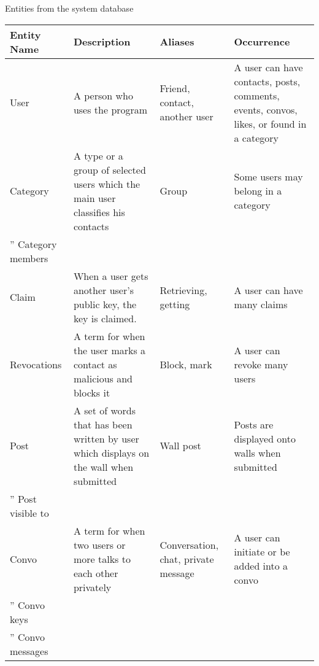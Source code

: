 Entities from the system database
\begin{center}
    \begin{tabular}{| l | l | l | l |}
    \hline
    Entity Name      & Description                                                                                              & Aliases                             & Occurrence                                     \\ \hline
    User             & A person who uses the program                                                                            & Friend, contact, another user       & A user can have contacts, posts, comments, events, convos, likes, or found in a category                                              \\ \hline
    Category         & A type or a group of selected users which the main user classifies his contacts                          & Group                               & Some users may belong in a category           \\ \hline
   '' Category members        &                      &                               &            \\ \hline
    Claim            & When a user gets another user's public key, the key is claimed.                                          & Retrieving, getting                 & A user can have many claims                   \\ \hline
    Revocations      & A term for when the user marks a contact as malicious and blocks it                                      & Block, mark                         & A user can revoke many users                  \\ \hline
    Post             & A set of words that has been written by user which displays on the wall when submitted                   & Wall post                           & Posts are displayed onto walls when submitted \\ \hline
   '' Post visible to         &                          &                           &         \\ \hline
    Convo            & A term for when two users or more talks to each other privately                                          & Conversation, chat, private message & A user can initiate or be added into a convo  \\ \hline
   '' Convo keys        &                          &                                &         \\ \hline
   '' Convo messages        &                          &                                &         \\ \hline

\end{tabular}
\end{center}

